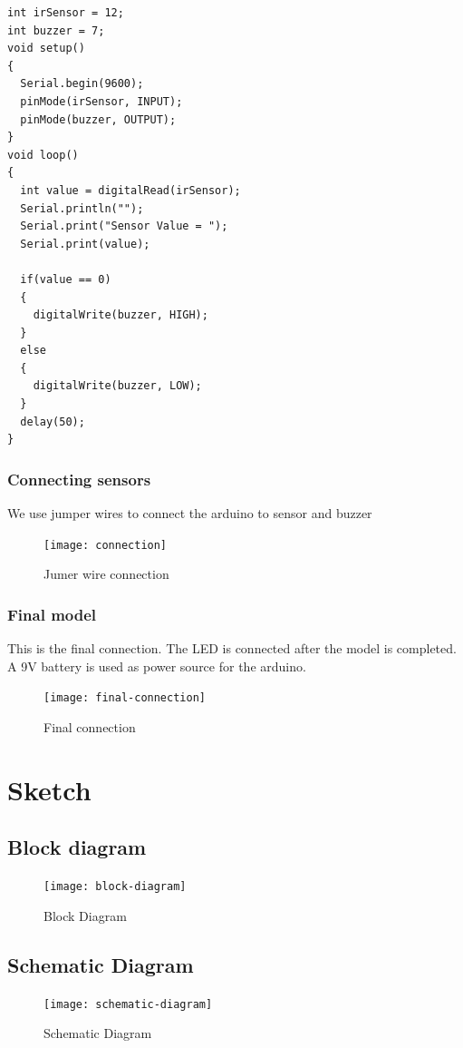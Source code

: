 \documentclass[conference]{IEEEtran}
\begin{document}
    \begin{verbatim}
int irSensor = 12;
int buzzer = 7;
void setup()
{
  Serial.begin(9600);
  pinMode(irSensor, INPUT);
  pinMode(buzzer, OUTPUT);
}
void loop()
{
  int value = digitalRead(irSensor);
  Serial.println("");
  Serial.print("Sensor Value = ");
  Serial.print(value);

  if(value == 0)
  {
    digitalWrite(buzzer, HIGH);
  }
  else
  {
    digitalWrite(buzzer, LOW);
  }
  delay(50);
}
    \end{verbatim}
    \subsubsection{Connecting sensors}
    We use jumper wires to connect the arduino to sensor and buzzer
    \begin{figure}[htbp]
        \centerline{\texttt{[image: connection]}}
        \caption{Jumer wire connection}
        \label{fig}
    \end{figure}

    \subsubsection{Final model}

    This is the final connection. The LED is connected after the model is completed.
    A 9V battery is used as power source for the arduino.
    \begin{figure}[htbp]
        \centerline{\texttt{[image: final-connection]}}
        \caption{Final connection}
        \label{fig}
    \end{figure}
    \section{Sketch}

    \subsection{Block diagram}
    \begin{figure}[htbp]
        \centerline{\texttt{[image: block-diagram]}}
        \caption{Block Diagram}
        \label{fig}
    \end{figure}

    \subsection{Schematic Diagram}
    \begin{figure}[htbp]
        \centerline{\texttt{[image: schematic-diagram]}}
        \caption{Schematic Diagram}
        \label{fig}
    \end{figure}
\end{document}
